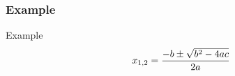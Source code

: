 \begin{frame}
\frametitle{Example}

\begin{block}{Example}
$$x_{1,2} = {-b \pm \sqrt{b^2 - 4ac} \over 2a}$$
\end{block}

\end{frame}